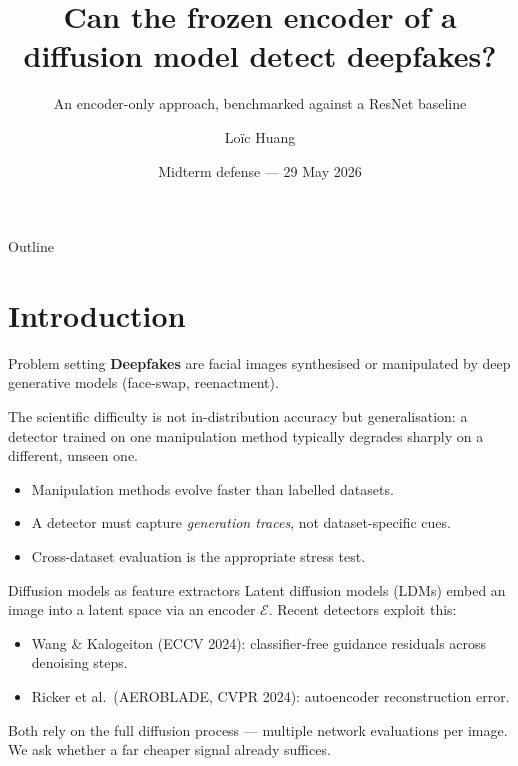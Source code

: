 \documentclass[aspectratio=169,11pt]{beamer}
\title{Can the frozen encoder of a diffusion model detect deepfakes?}
\subtitle{An encoder-only approach, benchmarked against a ResNet baseline}
\author{Loïc Huang}
\institute{EURECOM --- Semester Research Project, Spring 2026 \\ Supervisor: Alexandre Libourel}
\date{Midterm defense --- 29 May 2026}
\newcommand{\E}{\mathcal{E}}
\begin{document}
\maketitle

\begin{frame}{Outline}
  \tableofcontents
\end{frame}

\section{Introduction}

\begin{frame}{Problem setting}
  \textbf{Deepfakes} are facial images synthesised or manipulated by deep
  generative models (face-swap, reenactment).

  \medskip
  The scientific difficulty is \alert{not} in-distribution accuracy but
  \alert{generalisation}: a detector trained on one manipulation method
  typically degrades sharply on a different, unseen one.

  \medskip
  \begin{itemize}
    \item Manipulation methods evolve faster than labelled datasets.
    \item A detector must capture \emph{generation traces}, not dataset-specific cues.
    \item Cross-dataset evaluation is the appropriate stress test.
  \end{itemize}
\end{frame}

\begin{frame}{Diffusion models as feature extractors}
  Latent diffusion models (LDMs) embed an image into a latent space via an
  encoder $\E$. Recent detectors exploit this:
  \begin{itemize}
    \item Wang \& Kalogeiton (ECCV 2024): classifier-free guidance residuals
          across denoising steps.
    \item Ricker et al.\ (AEROBLADE, CVPR 2024): autoencoder reconstruction error.
  \end{itemize}
  \medskip
  Both rely on the \alert{full diffusion process} --- multiple network
  evaluations per image. We ask whether a far cheaper signal already suffices.
\end{frame}

\end{document}
